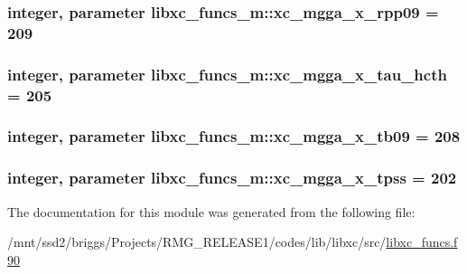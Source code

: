 \hypertarget{classlibxc__funcs__m_a46551ee73eda72d90e1f8933ecca9f1b}{
\subsubsection[{xc\-\_\-mgga\-\_\-x\-\_\-rpp09}]{\setlength{\rightskip}{0pt plus 5cm}integer, parameter libxc\-\_\-funcs\-\_\-m\-::xc\-\_\-mgga\-\_\-x\-\_\-rpp09 = 209}}\label{classlibxc__funcs__m_a46551ee73eda72d90e1f8933ecca9f1b}
\hypertarget{classlibxc__funcs__m_a57d9b8896da928d461e278dd0dce23af}{
\subsubsection[{xc\-\_\-mgga\-\_\-x\-\_\-tau\-\_\-hcth}]{\setlength{\rightskip}{0pt plus 5cm}integer, parameter libxc\-\_\-funcs\-\_\-m\-::xc\-\_\-mgga\-\_\-x\-\_\-tau\-\_\-hcth = 205}}\label{classlibxc__funcs__m_a57d9b8896da928d461e278dd0dce23af}
\hypertarget{classlibxc__funcs__m_aee6cc04ce4ca7723227366d4988bf0aa}{
\subsubsection[{xc\-\_\-mgga\-\_\-x\-\_\-tb09}]{\setlength{\rightskip}{0pt plus 5cm}integer, parameter libxc\-\_\-funcs\-\_\-m\-::xc\-\_\-mgga\-\_\-x\-\_\-tb09 = 208}}\label{classlibxc__funcs__m_aee6cc04ce4ca7723227366d4988bf0aa}
\hypertarget{classlibxc__funcs__m_a7334a3b44744cc6038e26ebbdbb0857f}{
\subsubsection[{xc\-\_\-mgga\-\_\-x\-\_\-tpss}]{\setlength{\rightskip}{0pt plus 5cm}integer, parameter libxc\-\_\-funcs\-\_\-m\-::xc\-\_\-mgga\-\_\-x\-\_\-tpss = 202}}\label{classlibxc__funcs__m_a7334a3b44744cc6038e26ebbdbb0857f}


The documentation for this module was generated from the following file\-:\begin{DoxyCompactItemize}
\item 
/mnt/ssd2/briggs/\-Projects/\-R\-M\-G\-\_\-\-R\-E\-L\-E\-A\-S\-E1/codes/lib/libxc/src/\hyperlink{libxc__funcs_8f90}{libxc\-\_\-funcs.\-f90}\end{DoxyCompactItemize}
